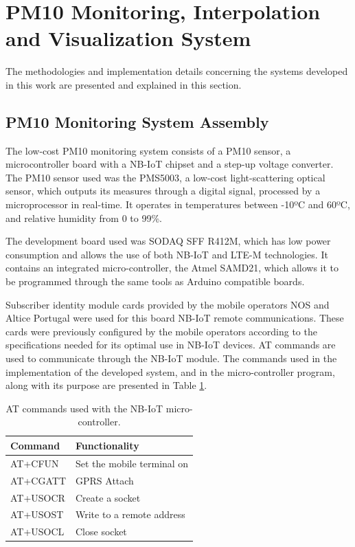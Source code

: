 \section{PM10 Monitoring, Interpolation and Visualization System}
\label{sec: imple}

The methodologies and implementation details concerning the systems developed in this work are presented and explained in this section.

\subsection{PM10 Monitoring System Assembly}

The low-cost PM10 monitoring system consists of a PM10 sensor, a microcontroller board with a NB-IoT chipset and a step-up voltage converter.
The PM10 sensor used was the PMS5003, a low-cost light-scattering optical sensor, which outputs its measures through a digital signal, processed by a microprocessor in real-time. It operates in temperatures between -10ºC and 60ºC, and relative humidity from 0 to 99\%.

The development board used was SODAQ SFF R412M, which has low power consumption and allows the use of both NB-IoT and LTE-M technologies. It contains an integrated micro-controller, the Atmel SAMD21, which allows it to be programmed through the same
tools as Arduino compatible boards.

Subscriber identity module cards provided by the mobile operators NOS and Altice Portugal were used for this board NB-IoT remote communications. These cards were previously configured by the mobile operators according to the specifications needed for its optimal use in NB-IoT devices. AT commands are used to communicate through the NB-IoT module. The commands used in the implementation of the developed system, and in the micro-controller program, along with its purpose are presented in Table \ref{table:atCommands}.

\begin{table}[ht]
\footnotesize
\centering
\caption{AT commands used with the NB-IoT micro-controller.}
\label{table:atCommands}
\begin{tabular}{l>{\raggedright\arraybackslash}p{}} %
\toprule
Command&Functionality\\
\midrule
AT+CFUN&Set the mobile terminal on\\
AT+CGATT&GPRS Attach\\
AT+USOCR&Create a socket\\
AT+USOST&Write to a remote address\\
AT+USOCL&Close socket\\
\bottomrule
\end{tabular}
\end{table}

